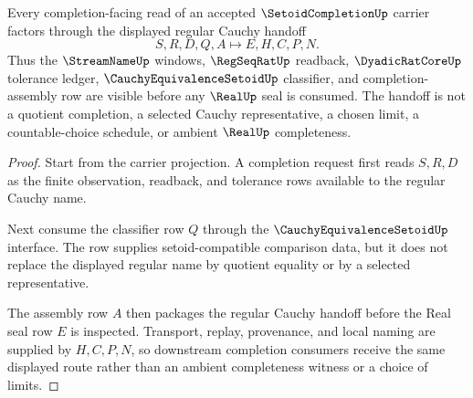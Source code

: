 \begin{theorem}
\label{thm:setoid-completion-regular-cauchy-handoff}
Every completion-facing read of an accepted $\SetoidCompletionUp$ carrier factors through the displayed regular Cauchy handoff
$$
S,R,D,Q,A \longmapsto E,H,C,P,N .
$$
Thus the $\StreamNameUp$ windows, $\RegSeqRatUp$ readback, $\DyadicRatCoreUp$ tolerance ledger, $\CauchyEquivalenceSetoidUp$ classifier, and completion-assembly row are visible before any $\RealUp$ seal is consumed. The handoff is not a quotient completion, a selected Cauchy representative, a chosen limit, a countable-choice schedule, or ambient $\RealUp$ completeness.
\end{theorem}
\begin{proof}
Start from the carrier projection. A completion request first reads $S,R,D$ as the finite observation, readback, and tolerance rows available to the regular Cauchy name.

Next consume the classifier row $Q$ through the $\CauchyEquivalenceSetoidUp$ interface. The row supplies setoid-compatible comparison data, but it does not replace the displayed regular name by quotient equality or by a selected representative.

The assembly row $A$ then packages the regular Cauchy handoff before the Real seal row $E$ is inspected. Transport, replay, provenance, and local naming are supplied by $H,C,P,N$, so downstream completion consumers receive the same displayed route rather than an ambient completeness witness or a choice of limits.
\end{proof}


\begin{closurestatus}{\SetoidCompletionUp}
  \theoryclosure{\seedClosure}
  \formalstatus{\unformalizedV}
\end{closurestatus}
